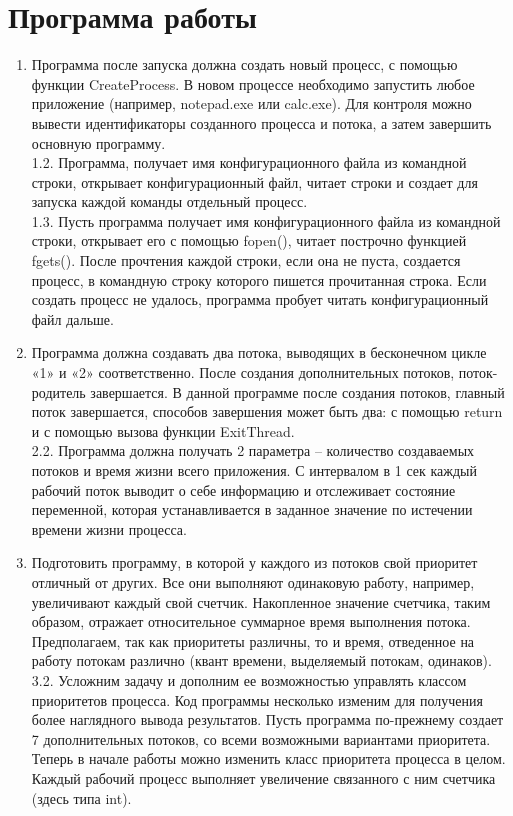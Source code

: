 \documentclass[a4paper]{article}
\begin{document}
\section{Программа работы}
\begin{enumerate}
\item Программа после запуска должна создать новый процесс, с помощью функции CreateProcess. В новом процессе необходимо запустить любое приложение (например, notepad.exe или calc.exe). Для контроля можно вывести идентификаторы созданного процесса и потока, а затем завершить основную программу.\\
1.2. Программа, получает имя конфигурационного файла из командной строки, открывает конфигурационный файл, читает строки и создает для запуска каждой команды отдельный процесс.\\
1.3. Пусть программа получает имя конфигурационного файла из командной строки, открывает его с помощью fopen(), читает построчно функцией fgets(). После прочтения каждой строки, если она не пуста, создается процесс, в командную строку которого пишется прочитанная строка. Если создать процесс не удалось, программа пробует читать конфигурационный файл дальше.
\item Программа должна создавать два потока, выводящих в бесконечном цикле «1» и «2» соответственно. После создания дополнительных потоков, поток-родитель завершается. В данной программе после создания потоков, главный поток завершается, способов завершения может быть два: с помощью return и с помощью вызова функции ExitThread.\\
2.2. Программа должна получать 2 параметра – количество создаваемых потоков и время жизни всего приложения. С интервалом в 1 сек каждый рабочий поток выводит о себе информацию и отслеживает состояние переменной, которая устанавливается в заданное значение по истечении времени жизни процесса.
\item Подготовить программу, в которой у каждого из потоков свой приоритет отличный от других. Все они выполняют одинаковую работу, например, увеличивают каждый свой счетчик. Накопленное значение счетчика, таким образом, отражает относительное суммарное время выполнения потока. Предполагаем, так как приоритеты различны, то и время, отведенное на работу потокам различно (квант времени, выделяемый потокам, одинаков).\\
3.2. Усложним задачу и дополним ее возможностью управлять классом приоритетов процесса. Код программы несколько изменим для получения более наглядного вывода результатов. Пусть программа по-прежнему создает 7 дополнительных потоков, со всеми возможными вариантами приоритета. Теперь в начале работы можно изменить класс приоритета процесса в целом. Каждый рабочий процесс выполняет увеличение связанного с ним счетчика (здесь типа int).\\

\end{enumerate}
\end{document}
